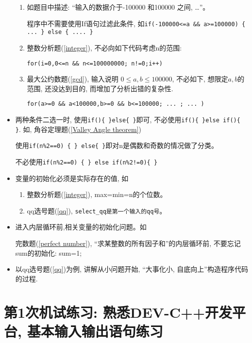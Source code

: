 \begin{itemize}
	\begin{enumerate}[(1)]
		\item 如题目中描述: ``输入的数据介于-100000 和100000 之间, \dots''。
		
		程序中不需要使用If语句过滤此条件, 如\lstinline|if(-100000<=a && a>=100000) { ... } else { .... }|
		
		\item 整数分析题(\ref{integer}), 不必向如下代码考虑n的范围:
		
		\lstinline|for(i=0,0<=n && n<=100000000; n!=0;i++)|
		
		\item 最大公约数题(\ref{gcd}), 输入说明 $0\le a,b\le 100000$, 不必如下, 想限定$a,b$的范围, 还没达到目的, 而增加了分析出错的复杂性.
		
		\lstinline|for(a>=0 && a<100000,b>=0 && b<=100000; ... ; ... )|
		
	\end{enumerate}
	
	\item 两种条件二选一时, 使用\lstinline|if(){ }else{ }|即可, 不必使用\lstinline|if(){ }else if(){ }|. 如, 角谷定理题(\ref{Valley Angle theorem})
	
	使用\lstinline|if(n%2==0) { } else{ }|即对n是偶数和奇数的情况做了分类。
	
	
	不必使用\lstinline|if(n%2==0) { } else if(n%2!=0){ }|
	
	\item 变量的初始化必须是实际存在的值, 如
	\begin{enumerate}[(1)]
		\item 整数分析题(\ref{integer}), max=min=n的个位数。
		\item qq选号题(\ref{qq}), \lstinline|select_qq是第一个输入的qq号|。
	\end{enumerate}
	
	\item 进入内层循环前,相关变量的初始化问题。如
	
	完数题(\ref{perfect number}), ``求某整数的所有因子和''的内层循环前, 不要忘记sum的初始化: sum=1;
	
	\item 以qq选号题(\ref{qq})为例, 讲解从小问题开始, ``大事化小, 自底向上''构造程序代码的过程.
\end{itemize}

\chapter{第1次机试练习: 熟悉DEV-C++开发平台, 基本输入输出语句练习}

